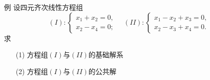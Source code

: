 \begin{li}{例}
  设四元齐次线性方程组
  $$
  (I):\left\{
    \begin{array}{l}
      x_1+x_2=0,\\
      x_2-x_4=0;
    \end{array}
  \right. \quad
  (II):\left\{
    \begin{array}{l}
      x_1-x_2+x_3=0,\\
      x_2-x_3+x_4=0.
    \end{array}
  \right.
  $$
  求
  \begin{itemize}
  \item[(1)] 方程组$(I)$与$(II)$的基础解系
  \item[(2)] 方程组$(I)$与$(II)$的公共解        
  \end{itemize}
\end{li}
